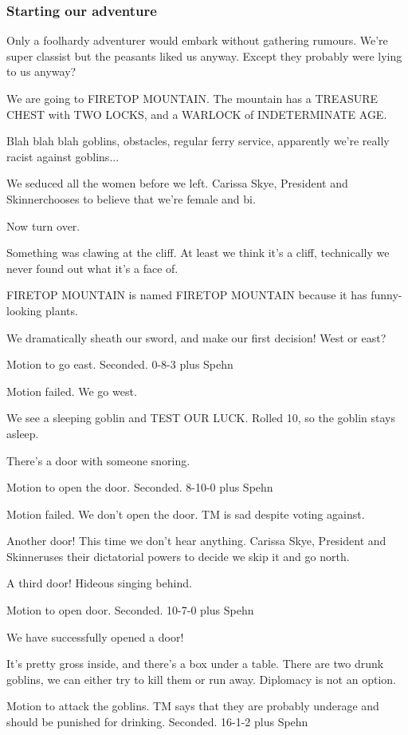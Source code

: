 \documentclass[10pt]{article}
\newcommand{\ps}{ plus Spehn\xspace}
\newcommand{\skinner}{Carissa Skye, President and Skinner}
\begin{document}
\subsubsection*{Starting our adventure}
Only a foolhardy adventurer would embark without gathering rumours.  We're super classist but the peasants liked us anyway.  Except they probably were lying to us anyway?

We are going to FIRETOP MOUNTAIN.  The mountain has a TREASURE CHEST with TWO LOCKS, and a WARLOCK of INDETERMINATE AGE.

Blah blah blah goblins, obstacles, regular ferry service, apparently we're really racist against goblins...

We seduced all the women before we left.  \skinner chooses to believe that we're female and bi.

Now turn over.

Something was clawing at the cliff.  At least we think it's a cliff, technically we never found out what it's a face of.

FIRETOP MOUNTAIN is named FIRETOP MOUNTAIN because it has funny-looking plants.

We dramatically sheath our sword, and make our first decision!  West or east?

Motion to go east.
Seconded.
0-8-3\ps

Motion failed. We go west.

We see a sleeping goblin and TEST OUR LUCK.  Rolled 10, so the goblin stays asleep.

There's a door with someone snoring.

Motion to open the door.
Seconded.
8-10-0\ps

Motion failed.  We don't open the door.  TM is sad despite voting against.

Another door!  This time we don't hear anything.  \skinner uses their dictatorial powers to decide we skip it and go north.

A third door!  Hideous singing behind.

Motion to open door.  Seconded.
10-7-0\ps

We have successfully opened a door!

It's pretty gross inside, and there's a box under a table.  There are two drunk goblins, we can either try to kill them or run away.  Diplomacy is not an option.

Motion to attack the goblins.  TM says that they are probably underage and should be punished for drinking.
Seconded.
16-1-2\ps
\end{document}
